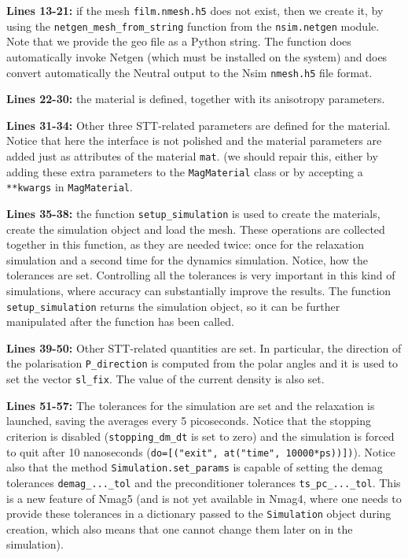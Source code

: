 \documentclass[11pt,oneside,openany]{article}
\begin{document}
\textbf{Lines 13-21:} if the mesh \verb|film.nmesh.h5| does not exist, then
we create it, by using the \verb|netgen_mesh_from_string| function from the
\verb|nsim.netgen| module. Note that we provide the geo file as a Python
string. The function does automatically invoke Netgen (which must be installed
on the system) and does convert automatically the Neutral output to the
Nsim \verb|nmesh.h5| file format.

\textbf{Lines 22-30:} the material is defined, together with its anisotropy
parameters.

\textbf{Lines 31-34:} Other three STT-related parameters are defined for the
material. Notice that here the interface is not polished and the material
parameters are added just as attributes of the material \verb|mat|. (we should
repair this, either by adding these extra parameters to the \verb|MagMaterial|
class or by accepting a \verb|**kwargs| in \verb|MagMaterial|.

\textbf{Lines 35-38:} the function \verb|setup_simulation| is used to create
the materials, create the simulation object and load the mesh. These operations
are collected together in this function, as they are needed twice: once for the
relaxation simulation and a second time for the dynamics simulation.  Notice,
how the tolerances are set. Controlling all the tolerances is very important in
this kind of simulations, where accuracy can substantially improve the
results. The function \verb|setup_simulation| returns the simulation object, so
it can be further manipulated after the function has been called.

\textbf{Lines 39-50:} Other STT-related quantities are set. In particular,
the direction of the polarisation \verb|P_direction| is computed from the
polar angles and it is used to set the vector \verb|sl_fix|.
The value of the current density is also set. 

\textbf{Lines 51-57:} The tolerances for the simulation are set
and the relaxation is launched, saving the averages every 5 picoseconds.
Notice that the stopping criterion is disabled (\verb|stopping_dm_dt| is set
to zero) and the simulation is forced to quit after 10 nanoseconds
(\verb|do=[("exit", at("time", 10000*ps))])|).
Notice also that the method \verb|Simulation.set_params| is capable
of setting the demag tolerances \verb|demag_..._tol| and the preconditioner
tolerances \verb|ts_pc_..._tol|. This is a new feature of Nmag5 (and is
not yet available in Nmag4, where one needs to provide these tolerances
in a dictionary passed to the \verb|Simulation| object during creation,
which also means that one cannot change them later on in the simulation).
\end{document}
